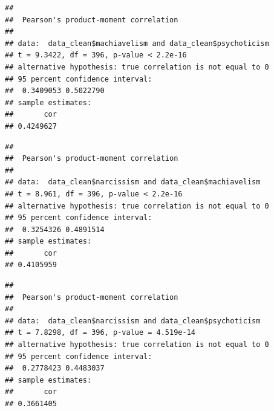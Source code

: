\documentclass[
]{article}
\newenvironment{Shaded}{\begin{snugshade}}{\end{snugshade}}
\newcommand{\FunctionTok}[1]{\textcolor[rgb]{0.13,0.29,0.53}{\textbf{#1}}}
\newcommand{\NormalTok}[1]{#1}
\newcommand{\SpecialCharTok}[1]{\textcolor[rgb]{0.81,0.36,0.00}{\textbf{#1}}}
\begin{document}
\begin{verbatim}
## 
##  Pearson's product-moment correlation
## 
## data:  data_clean$machiavelism and data_clean$psychoticism
## t = 9.3422, df = 396, p-value < 2.2e-16
## alternative hypothesis: true correlation is not equal to 0
## 95 percent confidence interval:
##  0.3409053 0.5022790
## sample estimates:
##       cor 
## 0.4249627
\end{verbatim}

\begin{Shaded}
\end{Shaded}

\begin{verbatim}
## 
##  Pearson's product-moment correlation
## 
## data:  data_clean$narcissism and data_clean$machiavelism
## t = 8.961, df = 396, p-value < 2.2e-16
## alternative hypothesis: true correlation is not equal to 0
## 95 percent confidence interval:
##  0.3254326 0.4891514
## sample estimates:
##       cor 
## 0.4105959
\end{verbatim}

\begin{Shaded}
\end{Shaded}

\begin{verbatim}
## 
##  Pearson's product-moment correlation
## 
## data:  data_clean$narcissism and data_clean$psychoticism
## t = 7.8298, df = 396, p-value = 4.519e-14
## alternative hypothesis: true correlation is not equal to 0
## 95 percent confidence interval:
##  0.2778423 0.4483037
## sample estimates:
##       cor 
## 0.3661405
\end{verbatim}

\begin{Shaded}
\end{Shaded}
\end{document}
